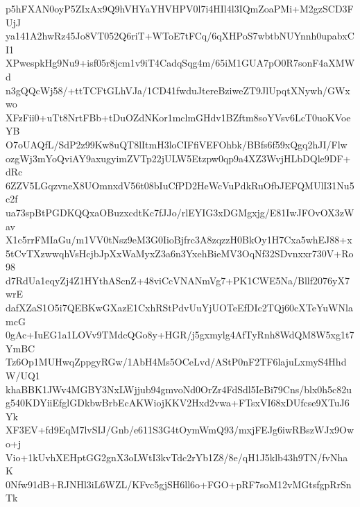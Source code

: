 p5hFXAN0oyP5ZIxAx9Q9hVHYaYHVHPV0l7i4HIl4l3IQmZoaPMi+M2gzSCD3FUjJ
ya141A2hwRz45Jo8VT052Q6riT+WToE7tFCq/6qXHPoS7wbtbNUYnnh0upabxCI1
XPwespkHg9Nu9+isf05r8jcm1v9iT4CadqSqg4m/65iM1GUA7pO0R7sonF4aXMWd
n3gQQcWj58/+ttTCFtGLhVJa/1CD41fwduJtereBziweZT9JlUpqtXNywh/GWxwo
XFzFii0+uTt8NrtFBb+tDuOZdNKor1mclmGHdv1BZftm8soYVsv6LcT0uoKVoeYB
O7oUAQfL/SdP2z99Kw8uQT8lItmH3loCIFfiVEFOhbk/BBfs6f59xQgq2hJI/Flw
ozgWj3mYoQviAY9axugyimZVTp22jULW5Etzpw0qp9a4XZ3WvjHLbDQle9DF+dRc
6ZZV5LGqzvneX8UOmnxdV56t08bIuCfPD2HeWcVuPdkRuOfbJEFQMUlI31Nu5c2f
ua73spBtPGDKQQxaOBuzxcdtKc7fJJo/rlEYIG3xDGMgxjg/E81IwJFOvOX3zWav
X1c5rrFMIaGu/m1VV0tNsz9eM3G0IioBjfrc3A8zqzzH0BkOy1H7Cxa5whEJ88+x
5tCvTXzwwqhVsHcjbJpXxWaMyxZ3a6n3YxehBieMV3OqNf32SDvnxxr730V+Ro98
d7RdUa1eqyZj4Z1HYthAScnZ+48viCcVNANmVg7+PK1CWE5Na/Bllf2076yX7wrE
dafXZaS1O5i7QEBKwGXazE1CxhRStPdvUuYjUOTeEfDIc2TQj60cXTeYuWNlamcG
0gAc+IuEG1a1LOVv9TMdcQGo8y+HGR/j5gxmylg4AfTyRnh8WdQM8W5xg1t7YmBC
Tz6Op1MUHwqZppgyRGw/1AbH4Ms5OCeLvd/AStP0nF2TF6lajuLxmyS4HhdW/UQ1
khaBBK1JWv4MGBY3NxLWjjub94gmvoNd0OrZr4FdSdl5IeBi79Cns/blx0h5c82u
g540KDYiiEfglGDkbwBrbEcAKWiojKKV2Hxd2vwa+FTsxVI68xDUfcse9XTuJ6Yk
XF3EV+fd9EqM7lvSIJ/Gnb/e611S3G4tOymWmQ93/mxjFEJg6iwRBszWJx9Owo+j
Vio+1kUvhXEHptGG2gnX3oLWtI3kvTdc2rYb1Z8/8e/qH1J5klb43h9TN/fvNhaK
0Nfw91dB+RJNHl3iL6WZL/KFvc5gjSH6ll6o+FGO+pRF7soM12vMGtsfgpRrSnTk

